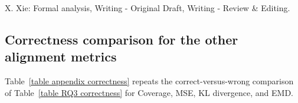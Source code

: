 \documentclass[lineno,pdflatex,sn-mathphys-num]{sn-jnl}%
\theoremstyle{thmstyleone}%
\theoremstyle{thmstyletwo}%
\theoremstyle{thmstylethree}%
\begin{document}
X. Xie: Formal analysis, Writing - Original Draft, Writing - Review \& Editing.


\begin{appendices}
\renewcommand{\theHtable}{\thetable}

\section{Correctness comparison for the other alignment metrics}\label{appendix correctness}

Table~\ref{table appendix correctness} repeats the correct-versus-wrong comparison of Table~\ref{table RQ3 correctness} for Coverage, MSE, KL divergence, and EMD.


\end{appendices}
\end{document}
